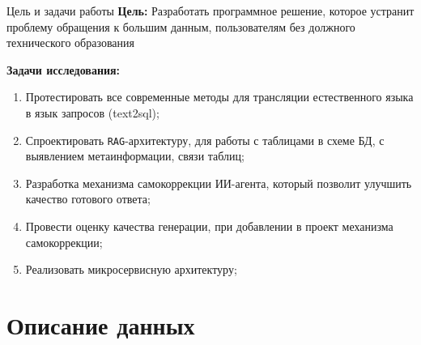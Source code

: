 \documentclass[10pt, aspectratio=169, unicode]{beamer}
\begin{document}
\begin{frame}{Цель и задачи работы}
    \textbf{Цель:} Разработать программное решение, которое устранит проблему обращения к большим данным, пользователям без должного технического образования
    
    \vspace{0.3cm}
    \textbf{Задачи исследования:}
    \begin{enumerate}
        \item Протестировать все современные методы для трансляции естественного языка в язык запросов (text2sql);
        \item Спроектировать \texttt{RAG}-архитектуру, для работы с таблицами в схеме БД, с выявлением метаинформации, связи таблиц;
        \item Разработка механизма самокоррекции ИИ-агента, который позволит улучшить качество готового ответа;
        \item Провести оценку качества генерации, при добавлении в проект механизма самокоррекции;
        \item Реализовать микросервисную архитектуру;
    \end{enumerate}
\end{frame}



\section{Описание данных}
\end{document}
